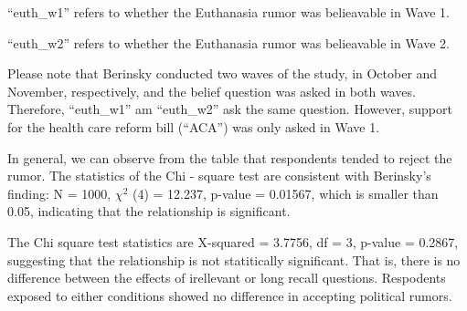 \documentclass[AER]{AEA}
\begin{document}
``euth\_w1'' refers to whether the Euthanasia rumor was belieavable in
Wave 1.

``euth\_w2'' refers to whether the Euthanasia rumor was belieavable in
Wave 2.

Please note that Berinsky conducted two waves of the study, in October
and November, respectively, and the belief question was asked in both
waves. Therefore, ``euth\_w1'' am ``euth\_w2'' ask the same question.
However, support for the health care reform bill (``ACA'') was only
asked in Wave 1.

\begin{table}

\caption{\label{tab:unnamed-chunk-13}Study 2 (Wave 1)}
\centering
{}
\end{table}

In general, we can observe from the table that respondents tended to
reject the rumor. The statistics of the Chi - square test are consistent
with Berinsky's finding: N = 1000, \(\chi^2\) (4) = 12.237, p-value =
0.01567, which is smaller than 0.05, indicating that the relationship is
significant.

\begin{table}

\caption{\label{tab:unnamed-chunk-14}Recall effects in Study 2 (Wave 2)}
\centering
{}
\end{table}

The Chi square test statistics are X-squared = 3.7756, df = 3, p-value =
0.2867, suggesting that the relationship is not statitically
significant. That is, there is no difference between the effects of
irellevant or long recall questions. Respodents exposed to either
conditions showed no difference in accepting political rumors.
\end{document}
